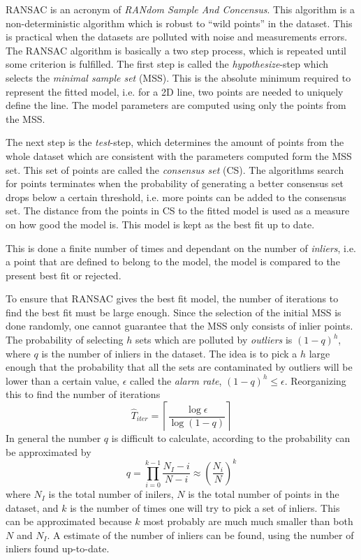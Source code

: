 RANSAC is an acronym of \emph{RANdom Sample And Concensus}. This algorithm is a
non-deterministic algorithm which is robust to ``wild points'' in the dataset. This is
practical when the datasets are polluted with noise and measurements errors.
The RANSAC algorithm is basically a two step process, which is repeated until some
criterion is fulfilled. The first step is called the \emph{hypothesize}-step which selects
the \emph{minimal sample set} (MSS). This is the absolute minimum required to represent
the fitted model, i.e. for a 2D line, two points are needed to uniquely define the
line. The model parameters are computed using only the points from the MSS.

The next step is the \emph{test}-step, which determines the amount of points from the
whole dataset which are consistent with the parameters computed form the MSS set. This set
of points are called the \emph{consensus set} (CS). The algorithms search for points
terminates when the probability of generating a better consensus set drops below a certain threshold, i.e.
more points can be added to the consensus set. The distance from the points in CS to the 
fitted model is used as a measure on how good the model is. This model is kept as the best
fit up to date. \cite{ransac-dummies}

This is done a finite number of times and dependant on the number of \emph{inliers}, i.e.
a point that are defined to belong to the model, the model is compared to the present best
fit or rejected.

To ensure that RANSAC gives the best fit model, the number of iterations to find the best
fit must be large enough. Since the selection of the initial MSS is done randomly, one
cannot guarantee that the MSS only consists of inlier points. The probability of
selecting $h$ sets which are polluted by \emph{outliers} is $(1 - q)^h$, where $q$ is the
number of inliers in the dataset. The idea is to pick a $h$ large enough that the
probability that all the sets are contaminated by outliers will be lower than a certain
value, $\epsilon$ called the \emph{alarm rate}, $(1 - q)^h \leq \epsilon$. Reorganizing
this to find the number of iterations
\begin{equation}
    \hat{T}_{iter} = \left \lceil \frac{\log \epsilon}{\log (1 - q)} \right\rceil
\end{equation}
In general the number $q$ is difficult to calculate, according to \cite{ransac-dummies}
the probability can be approximated by 
\begin{equation}
    q = \prod_{i = 0}^{k-1} \frac{N_I - i}{N - i} \approx \left ( \frac{N_i}{N} \right)^k
\end{equation}
where $N_I$ is the total number of inilers, $N$ is the total number of points in the
dataset, and $k$ is the number of times one will try to pick a set of inliers. This can be
approximated because $k$ most probably are much much smaller than both $N$ and $N_I$. A
estimate of the number of inliers can be found, using the number of inliers found
up-to-date. \cite{ransac-dummies}


